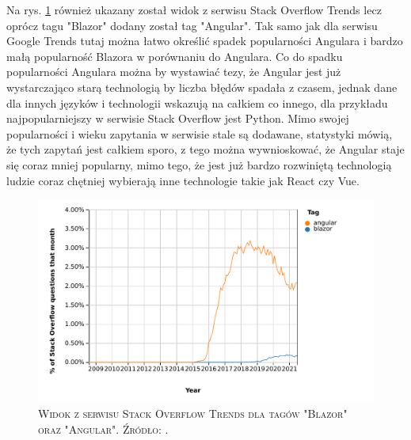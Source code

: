 \documentclass[12pt,a4paper,oneside]{book}
\newcommand{\captionT}[1]{\caption{\textsc{\footnotesize{#1}}}}
\begin{document}
Na rys. \ref{rys_stackoverflow_trends_blazor_angular} również ukazany został widok z serwisu Stack Overflow Trends lecz oprócz tagu "Blazor" dodany został tag "Angular". Tak samo jak dla serwisu Google Trends tutaj można łatwo określić spadek popularności Angulara i bardzo małą popularność Blazora w porównaniu do Angulara. Co do spadku popularności Angulara można by wystawiać tezy, że Angular jest już wystarczająco starą technologią by liczba błędów spadała z czasem, jednak dane dla innych języków i technologii wskazują na całkiem co innego, dla przykładu najpopularniejszy w serwisie Stack Overflow jest Python. Mimo swojej popularności i wieku zapytania w serwisie stale są dodawane, statystyki mówią, że tych zapytań jest całkiem sporo, z tego można wywnioskować, że Angular staje się coraz mniej popularny, mimo tego, że jest już bardzo rozwiniętą technologią ludzie coraz chętniej wybierają inne technologie takie jak React czy Vue.

\begin{figure}[H]
\centering
\includegraphics[width=1\textwidth]{images/StackOverflowBlazorAngular.pdf}
\captionT{Widok z serwisu Stack Overflow Trends dla tagów "Blazor" oraz "Angular". Źródło: \cite{STACKOVERFLOW_TRENDS_BLAZOR_ANGULAR}.}
\label{rys_stackoverflow_trends_blazor_angular}
\end{figure}
\end{document}
